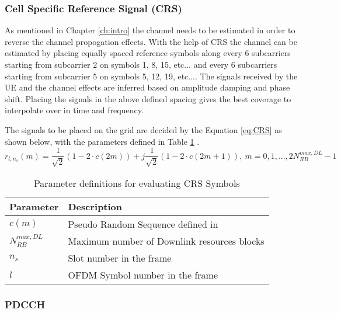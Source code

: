 \subsubsection{Cell Specific Reference Signal (CRS)} \label{sssec:CRS}
        As mentioned in Chapter \ref{ch:intro} the channel needs to be estimated in order to reverse the channel propogation effects. With the help of CRS the channel can be estimated by placing equally spaced reference symbols along every 6 subcarriers starting from subcarrier 2 on symbols 1, 8, 15, etc... and every 6 subcarriers starting from subcarrier 5 on symbols 5, 12, 19, etc...\cite{3gpp36211}. The signals received by the UE and the channel effects are inferred based on amplitude damping and phase shift. Placing the signals in the above defined spacing gives the best coverage to interpolate over in time and frequency.

        The signals to be placed on the grid are decided by the Equation \ref{eq:CRS} as shown below, with the parameters defined in Table \ref{tab:CRSParam} \cite{3gpp36211}.
        \begin{equation} \label{eq:CRS}
            r_{l,n_s}(m) = \frac{1}{\sqrt{2}}(1-2{\cdot}c(2m)) + j\frac{1}{\sqrt{2}}(1-2{\cdot}c(2m+1)),\ m=0,1,...,2N_{RB}^{max,DL}-1
        \end{equation}

        \begin{table}[H]
            \begin{center}
                \begin{tabular}{|l|l|}
                    \hline
                    Parameter& Description\\ \hline
                    $c(m)$& Pseudo Random Sequence defined in \cite{3gpp36211}\\ \hline
                    $N_{RB}^{max,DL}$& Maximum number of Downlink resources blocks\\ \hline
                    $n_s$& Slot number in the frame\\ \hline
                    $l$& OFDM Symbol number in the frame\\
                    \hline
                \end{tabular}
                \caption{Parameter definitions for evaluating CRS Symbols}
                \label{tab:CRSParam}
            \end{center}
        \end{table}

\subsubsection{PDCCH}

